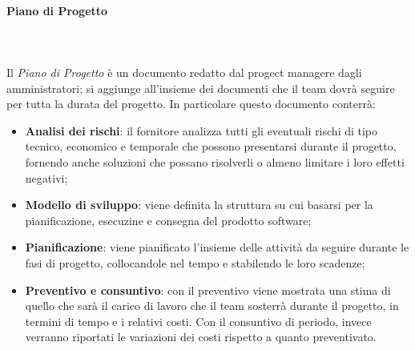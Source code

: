 			\paragraph{Piano di Progetto} \mbox{} \\ \mbox{} \\
			Il \textit{Piano di Progetto} è un documento redatto dal progect manager\glo e dagli amministratori; si aggiunge all'insieme dei documenti che il team dovrà seguire per tutta la durata del progetto. In particolare questo documento conterrà:
			\begin{itemize}
				\item \textbf{Analisi dei rischi}: il fornitore analizza tutti gli eventuali rischi di tipo tecnico, economico e temporale che possono presentarsi durante il progetto, fornendo anche soluzioni che possano risolverli o almeno limitare i loro effetti negativi;
				\item \textbf{Modello di sviluppo}: viene definita la struttura su cui basarsi per la pianificazione, esecuzine e consegna del prodotto software;
				\item \textbf{Pianificazione}: viene pianificato l'insieme delle attività da seguire durante le fasi di progetto, collocandole nel tempo e stabilendo le loro scadenze;
				\item \textbf{Preventivo e consuntivo}: con il preventivo viene mostrata una stima di quello che sarà il carico di lavoro che il team sosterrà durante il progetto, in termini di tempo e i relativi costi. Con il consuntivo di periodo, invece verranno riportati le variazioni dei costi rispetto a quanto preventivato.
			\end{itemize}


